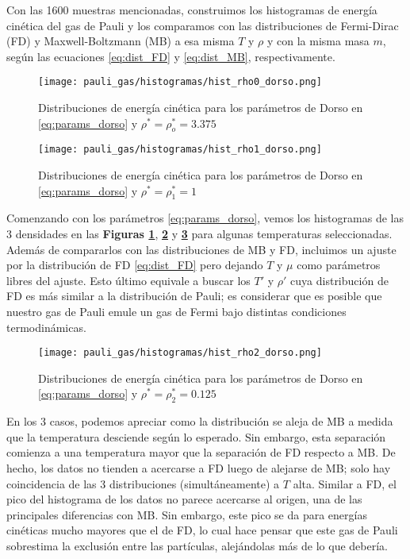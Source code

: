 Con las 1600 muestras mencionadas, construimos los histogramas de energía cinética del gas de Pauli y los comparamos con las distribuciones de Fermi-Dirac (FD) y Maxwell-Boltzmann 
(MB) a esa misma $T$ y $\rho$ y con la misma masa $m$, según las ecuaciones \eqref{eq:dist_FD} y \eqref{eq:dist_MB}, respectivamente.

\begin{figure}[H]
	\centering
	\texttt{[image: pauli\_gas/histogramas/hist\_rho0\_dorso.png]}
	\caption{Distribuciones de energía cinética para los parámetros de Dorso en \eqref{eq:params_dorso} y $\rho^* = \rho_o^* = 3.375$}
	\label{fig:hist_rho0_dorso}
\end{figure}

\begin{figure}[H]
	\centering
	\texttt{[image: pauli\_gas/histogramas/hist\_rho1\_dorso.png]}
	\caption{Distribuciones de energía cinética para los parámetros de Dorso en \eqref{eq:params_dorso} y $\rho^* = \rho_1^* = 1$}
	\label{fig:hist_rho1_dorso}
\end{figure}

Comenzando con los parámetros \eqref{eq:params_dorso}, vemos los histogramas de las 3 densidades en las \textbf{Figuras \ref{fig:hist_rho0_dorso}},
\textbf{\ref{fig:hist_rho1_dorso}} y \textbf{\ref{fig:hist_rho2_dorso}} para algunas temperaturas seleccionadas.
Además de compararlos con las distribuciones de MB y FD, incluimos un ajuste por la distribución de FD \eqref{eq:dist_FD} pero dejando $T$ y $\mu$ como parámetros libres del ajuste.
Esto último equivale a buscar los $T'$ y $\rho'$ cuya distribución de FD es más similar a la distribución de Pauli; es considerar que es posible que nuestro gas de Pauli
emule un gas de Fermi bajo distintas condiciones termodinámicas.

\begin{figure}[H]
	\centering
	\texttt{[image: pauli\_gas/histogramas/hist\_rho2\_dorso.png]}
	\caption{Distribuciones de energía cinética para los parámetros de Dorso en \eqref{eq:params_dorso} y $\rho^* = \rho_2^* = 0.125$}
	\label{fig:hist_rho2_dorso}
\end{figure}

En los 3 casos, podemos apreciar como la distribución se aleja de MB a medida que la temperatura desciende según lo esperado.
Sin embargo, esta separación comienza a una temperatura mayor que la separación de FD respecto a MB.
De hecho, los datos no tienden a acercarse a FD luego de alejarse de MB; solo hay coincidencia de las 3 distribuciones (simultáneamente) a $T$ alta.
Similar a FD, el pico del histograma de los datos no parece acercarse al origen, una de las principales diferencias con MB.
Sin embargo, este pico se da para energías cinéticas mucho mayores que el de FD, lo cual hace pensar que este gas de Pauli sobrestima la exclusión entre las partículas, alejándolas
más de lo que debería.

